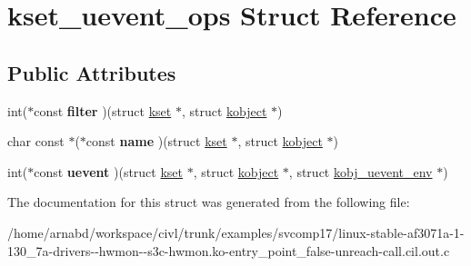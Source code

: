 \hypertarget{structkset__uevent__ops}{}\section{kset\+\_\+uevent\+\_\+ops Struct Reference}
\label{structkset__uevent__ops}
\subsection*{Public Attributes}
\begin{DoxyCompactItemize}
\item 
\hypertarget{structkset__uevent__ops_a565bdd93830a34dffc9d3bd2fec3aa93}{}int($\ast$const {\bfseries filter} )(struct \hyperlink{structkset}{kset} $\ast$, struct \hyperlink{structkobject}{kobject} $\ast$)\label{structkset__uevent__ops_a565bdd93830a34dffc9d3bd2fec3aa93}

\item 
\hypertarget{structkset__uevent__ops_a934d8b13ad3803b23ad7bf51b18f1c79}{}char const $\ast$($\ast$const {\bfseries name} )(struct \hyperlink{structkset}{kset} $\ast$, struct \hyperlink{structkobject}{kobject} $\ast$)\label{structkset__uevent__ops_a934d8b13ad3803b23ad7bf51b18f1c79}

\item 
\hypertarget{structkset__uevent__ops_aeb2facea0b2696900e7ee67b873689a8}{}int($\ast$const {\bfseries uevent} )(struct \hyperlink{structkset}{kset} $\ast$, struct \hyperlink{structkobject}{kobject} $\ast$, struct \hyperlink{structkobj__uevent__env}{kobj\+\_\+uevent\+\_\+env} $\ast$)\label{structkset__uevent__ops_aeb2facea0b2696900e7ee67b873689a8}

\end{DoxyCompactItemize}


The documentation for this struct was generated from the following file\+:\begin{DoxyCompactItemize}
\item 
/home/arnabd/workspace/civl/trunk/examples/svcomp17/linux-\/stable-\/af3071a-\/1-\/130\+\_\+7a-\/drivers-\/-\/hwmon-\/-\/s3c-\/hwmon.\+ko-\/entry\+\_\+point\+\_\+false-\/unreach-\/call.\+cil.\+out.\+c\end{DoxyCompactItemize}
